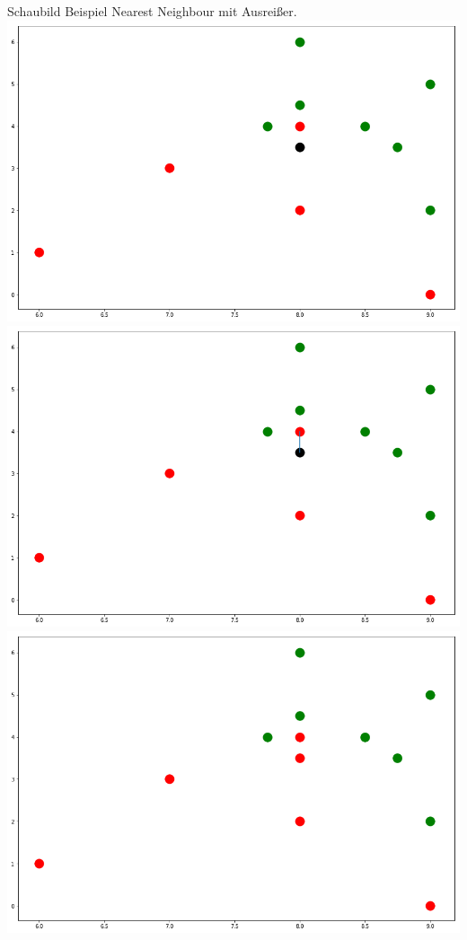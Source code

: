 \documentclass[a4paper]{scrartcl}
\begin{document}
\begin{multicols}{2}
                            Schaubild Beispiel Nearest Neighbour mit Ausreißer.
                            \includegraphics[width=\linewidth]{errnn1.png}
                            \includegraphics[width=\linewidth]{errnn2.png}
                            \includegraphics[width=\linewidth]{errnn3.png}
                         

\end{multicols}
\end{document}
